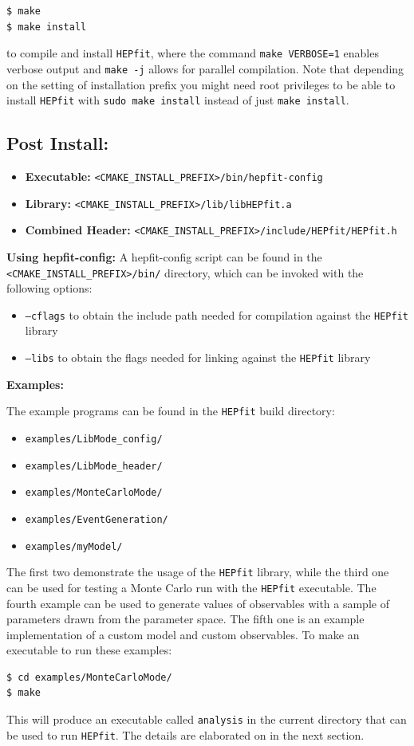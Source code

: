 \documentclass[preprint,3p,12pt]{elsarticle}
\newcommand{\HEPfit}{\texttt{HEPfit}\xspace}
\begin{document}
{\begin{lstlisting} 
$ make  
$ make install  
\end{lstlisting} 
to compile and install \HEPfit, where the command \texttt{make VERBOSE=1}
enables verbose output and \texttt{make -j} allows for parallel compilation.
Note that depending on the setting of installation prefix you might
need root privileges to be able to install \HEPfit with \texttt{sudo make
install} instead of just \texttt{make install}.\\

\subsection{Post Install:}

\begin{itemize}
\item{\bf Executable:} \texttt{<CMAKE\_INSTALL\_PREFIX>/bin/hepfit-config}
\item{\bf Library:} \texttt{<CMAKE\_INSTALL\_PREFIX>/lib/libHEPfit.a}
\item{\bf Combined Header:} \texttt{<CMAKE\_INSTALL\_PREFIX>/include/HEPfit/HEPfit.h}
\end{itemize}

{\bf Using hepfit-config:}
A hepfit-config script can be found in the \texttt{<CMAKE\_INSTALL\_PREFIX>/bin/}
directory, which can be invoked with the following options:
\begin{itemize}
\item \texttt{--cflags} to obtain the include path needed for compilation against the \HEPfit library

\item \texttt{--libs} to obtain the flags needed for linking against the \HEPfit library
\end{itemize}

{\bf Examples:}

The example programs can be found in the \HEPfit build directory:  
\begin{itemize}
\item \texttt{examples/LibMode\_config/}  
\item \texttt{examples/LibMode\_header/} 
\item \texttt{examples/MonteCarloMode/}
\item \texttt{examples/EventGeneration/}
\item \texttt{examples/myModel/}
\end{itemize}
The first two demonstrate the usage of the \HEPfit library, while 
the third one can be used for testing a Monte Carlo run with the \HEPfit 
executable. The fourth example can be used to generate values of observables with a sample of parameters drawn from the parameter space. The fifth one is an example implementation of a custom 
model and custom observables. To make an executable to run these examples:
\begin{lstlisting} 
$ cd examples/MonteCarloMode/
$ make  
\end{lstlisting} 
This will produce an executable called \texttt{analysis} in the current directory that can be used to run \HEPfit. The details are elaborated on in the next section.



}
\end{document}
